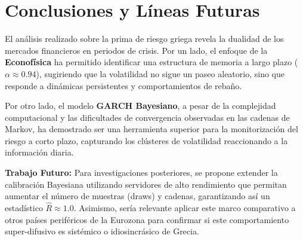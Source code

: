 \section{Conclusiones y Líneas Futuras}
\label{sec:conclusiones}

El análisis realizado sobre la prima de riesgo griega revela la dualidad de los mercados financieros en periodos de crisis. Por un lado, el enfoque de la \textbf{Econofísica} ha permitido identificar una estructura de memoria a largo plazo ($\alpha \approx 0.94$), sugiriendo que la volatilidad no sigue un paseo aleatorio, sino que responde a dinámicas persistentes y comportamientos de rebaño.

Por otro lado, el modelo \textbf{GARCH Bayesiano}, a pesar de la complejidad computacional y las dificultades de convergencia observadas en las cadenas de Markov, ha demostrado ser una herramienta superior para la monitorización del riesgo a corto plazo, capturando los clústeres de volatilidad reaccionando a la información diaria.

\textbf{Trabajo Futuro:}
Para investigaciones posteriores, se propone extender la calibración Bayesiana utilizando servidores de alto rendimiento que permitan aumentar el número de muestras (draws) y cadenas, garantizando así un estadístico $\hat{R} \approx 1.0$. Asimismo, sería relevante aplicar este marco comparativo a otros países periféricos de la Eurozona para confirmar si este comportamiento super-difusivo es sistémico o idiosincrásico de Grecia.